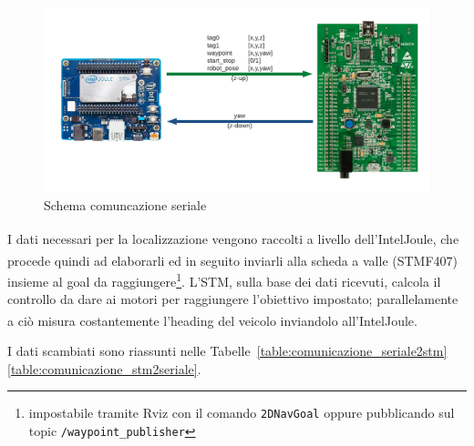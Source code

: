 \bigskip

\begin{figure}[h] 
\centering    
\includegraphics[width=1\textwidth]{Capitolo2/Figs/schema_tattico.pdf}
\caption[Schema comunicazione seriale]{Schema comuncazione seriale}
\label{fig:schema_serialcom}
\end{figure}

\bigskip

I dati necessari per la localizzazione vengono raccolti a livello dell'Intel\textsuperscript\textregistered Joule\texttrademark\hspace{1mm}, che procede quindi ad elaborarli ed in seguito inviarli alla scheda a valle (STMF407\textsuperscript\textregistered) insieme al goal da raggiungere\footnote{impostabile tramite Rviz con il comando \texttt{2DNavGoal} oppure pubblicando sul topic \texttt{/waypoint\_publisher}}.
L’STM\textsuperscript\textregistered, sulla base dei dati ricevuti, calcola il controllo da dare ai motori per raggiungere l’obiettivo impostato; parallelamente a ciò misura costantemente l'heading del veicolo inviandolo all'Intel\textsuperscript\textregistered Joule\texttrademark\hspace{1mm}.

I dati scambiati sono riassunti nelle Tabelle~\ref{table:comunicazione_seriale2stm}\ref{table:comunicazione_stm2seriale}.

\bigskip
\bigskip

